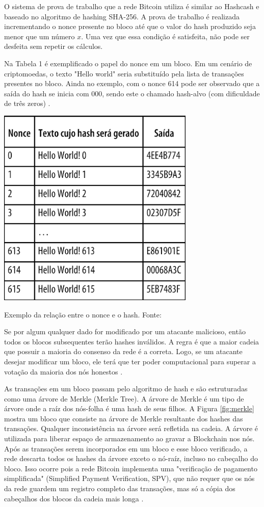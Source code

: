 \documentclass[openright]{normas-utf-tex} %
\begin{document}
O sistema de prova de trabalho que a rede Bitcoin utiliza é similar ao Hashcash \cite{Back2002} e baseado no algoritmo de hashing SHA-256. A prova de trabalho é realizada incrementando o nonce presente no bloco até que o valor do hash produzido seja menor que um número $x$. Uma vez que essa condição é satisfeita, não pode ser desfeita sem repetir os cálculos. 

Na Tabela 1 é exemplificado o papel do nonce em um bloco. Em um cenário de criptomoedas, o texto "Hello world" seria substituído pela lista de transações presentes no bloco. Ainda no exemplo, com o nonce 614 pode ser observado que a saída do hash se inicia com 000, sendo este o chamado hash-alvo (com dificuldade de três zeros) \cite{Drescher2018}.

\begin{table}[ht]
\label{tbl:nonce}
\centering
\includegraphics[width=.5\textwidth]{nonce.png}
\caption{Exemplo da relação entre o nonce e o hash. Fonte: }
\end{table}

Se por algum qualquer dado for modificado por um atacante malicioso, então todos os blocos subsequentes terão hashes inválidos. A regra é que a maior cadeia que possuir a maioria do consenso da rede é a correta. Logo, se um atacante desejar modificar um bloco, ele terá que ter poder computacional para superar a votação da maioria dos nós honestos \cite{Vujicic2018}.

As transações em um bloco passam pelo algoritmo de hash e são estruturadas como uma árvore de Merkle (Merkle Tree). A árvore de Merkle é um tipo de árvore onde a raíz dos nós-folha é uma hash de seus filhos. A Figura \ref{fig:merkle} mostra um bloco que consiste na árvore de Merkle resultante dos hashes das transações. Qualquer inconsistência na árvore será refletida na cadeia. A árvore é utilizada  para liberar espaço de armazenamento ao gravar a Blockchain nos nós. Após as transações serem incorporados em um bloco e esse bloco verificado, a rede descarta todos os hashes da árvore exceto o nó-raíz, incluso no cabeçalho do bloco. Isso ocorre pois a rede Bitcoin implementa uma "verificação de pagamento simplificada" (Simplified Payment Verification, SPV), que não requer que os nós da rede guardem um registro completo das transações, mas só a cópia dos cabeçalhos dos blocos da cadeia mais longa \cite{Nakamoto2008}.
\end{document}
